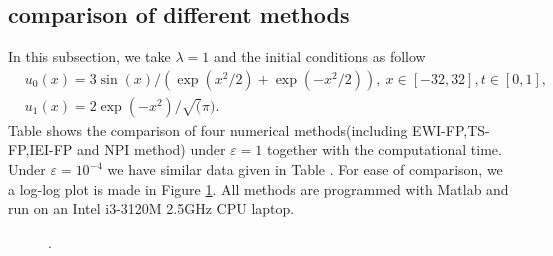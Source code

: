 \documentclass[final,leqno,showlabe]{siamltex}
\begin{document}
\subsection{comparison of different methods}
In this subsection, we take $\lambda=1$ and the initial conditions as follow
\begin{eqnarray}\label{ini:3}
&u_0(x)=3\sin(x)/(\exp(x^2/2)+\exp(-x^2/2) ),\ x\in[-32,32],t\in[0,1], \\
&u_1(x)=2\exp(-x^2)/\sqrt(\pi).
\end{eqnarray}
Table  shows the comparison of four numerical methods(including EWI-FP\cite{finiteE:2012},TS-FP\cite{Timesplitting:2014},IEI-FP\cite{Asymptoticiterative:2018} and NPI method) under $\varepsilon=1$ together with the computational time. Under $\varepsilon=10^{-4}$ we have similar data given in Table . For ease of comparison, we a log-log plot is made in Figure \ref{fig:comparison}. All methods are programmed with Matlab and run on an Intel i3-3120M 2.5GHz CPU laptop.

\begin{figure}[tbhp]%
  \centering

  \centering
  \caption{ .}
\label{fig:comparison}
\end{figure}
\end{document}
